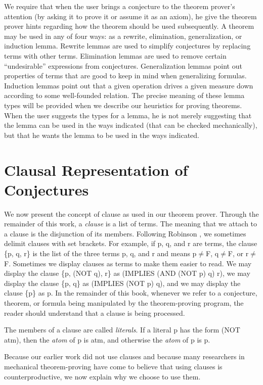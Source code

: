 \documentclass[10pt]{book}
\begin{document}
We  require that when the user brings a  conjecture
to the theorem prover's attention (by asking it to prove it or assume it as an axiom), he give
the theorem prover 
hints regarding how the theorem should be used subsequently.
A theorem may be used in any of four ways:
as a rewrite, elimination, generalization, or induction lemma.
Rewrite lemmas are used to simplify conjectures by replacing terms with other
terms.  Elimination lemmas are used to remove certain ``undesirable''
expressions from conjectures.  Generalization lemmas point out properties
of terms that are good to keep in mind when generalizing formulas.
Induction lemmas point out that a given operation drives a given
measure down according to some well-founded relation.
The precise meaning of these lemma types will be
provided when we describe our heuristics for proving theorems.
When the user suggests the types for a lemma, he is not merely suggesting
that the lemma can be used in the ways indicated
(that can be checked mechanically),
but that  he wants the lemma to be used in the ways indicated.

\section{Clausal Representation of Conjectures}
We now present the concept of clause as used in our
theorem prover.  Through the remainder of this
work,
a \emph{clause} is a list of terms.  The meaning that we attach to
a clause is the disjunction of its members.
Following Robinson \cite{ROBINSON}, we sometimes delimit
clauses with set brackets.
For example, if p, q, and r are terms, the clause \{p, q, r\}
is the list of the three terms p, q, and r and means p$\neq$F,
q$\neq$F, or r$\neq$F.
Sometimes we display clauses as terms to make them easier
to read.  We may display the clause \{p, (NOT q), r\} as
(IMPLIES (AND (NOT p) q) r),  we may display the clause
\{p, q\} as (IMPLIES (NOT p) q), and we may display the
clause \{p\} as p.
In the remainder of this book, whenever we refer to a conjecture,
theorem, or formula being manipulated by the theorem-proving program,
the reader should understand that a clause is being processed.

The
members of a clause are called \emph{literals}.
If a literal p has the form (NOT atm), then the \emph{atom} of p is atm, and
otherwise the \emph{atom} of p is p.

Because our earlier work \cite{JACM} did not use clauses and because many
researchers in mechanical theorem-proving have come to believe
that using clauses is counterproductive, we now explain
why we choose to use them.
\end{document}

